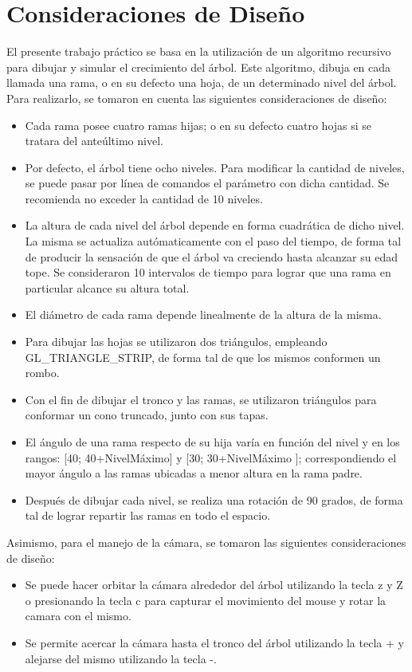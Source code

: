 \documentclass[11pt]{article}
\begin{document}
\section{Consideraciones de Dise\~no}
  El presente trabajo pr\'actico se basa en la utilizaci\'on de un algoritmo recursivo para dibujar y simular el crecimiento del \'arbol.
Este algoritmo, dibuja en cada llamada una rama, o en su defecto una hoja, de un determinado nivel del \'arbol. \\
  Para realizarlo, se tomaron en cuenta las siguientes consideraciones de dise\~no:
\begin{itemize} 
 \item Cada rama posee cuatro ramas hijas; o en su defecto cuatro hojas si se tratara del ante\'ultimo nivel. 
 \item Por defecto, el \'arbol tiene ocho niveles. Para modificar la cantidad de niveles, se puede pasar por l\'inea de comandos el par\'ametro con dicha cantidad. 
Se recomienda no exceder la cantidad de 10 niveles.
 \item La altura de cada nivel del \'arbol depende en forma cuadr\'atica de dicho nivel. La misma se actualiza aut\'omaticamente 
con el paso del tiempo, de forma tal de producir la sensaci\'on de que el \'arbol va creciendo hasta alcanzar su edad tope. Se consideraron 10
intervalos de tiempo para lograr que una rama en particular alcance su altura total.
 \item El di\'ametro de cada rama depende linealmente de la altura de la misma.
 \item Para dibujar las hojas se utilizaron dos tri\'angulos, empleando GL\_TRIANGLE\_STRIP, de forma tal de que los mismos conformen un rombo.
 \item Con el fin de dibujar el tronco y las ramas, se utilizaron tri\'angulos para conformar un cono truncado, junto con sus tapas.
 \item El \'angulo de una rama respecto de su hija var\'ia en funci\'on del nivel y en los rangos: [40; 40+NivelM\'aximo] y [30; 30+NivelM\'aximo ]; correspondiendo
 el mayor \'angulo a las ramas ubicadas a menor altura en la rama padre.
 \item Despu\'es de dibujar cada nivel, se realiza una rotaci\'on de 90 grados, de forma tal de lograr repartir las ramas en todo el espacio.
\end{itemize}

Asimismo, para el manejo de la c\'amara, se tomaron las siguientes consideraciones de dise\~no:
\begin{itemize} 
 \item Se puede hacer orbitar la c\'amara alrededor del \'arbol utilizando la tecla z y Z o presionando la tecla c para capturar el movimiento del mouse y rotar la camara con el mismo.
\item Se permite acercar la c\'amara hasta el tronco del \'arbol utilizando la tecla + y alejarse del mismo utilizando la tecla -.
\end{itemize}
\end{document}
